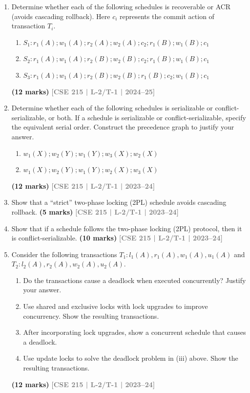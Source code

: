 \documentclass[12pt]{article}
\newcommand{\yr}[1]{\hfill\textcolor{gray}{\small\textbf{[#1]}}}
\newcommand{\mk}[1]{\textcolor{orange!70!black}{\small\textbf{(#1 marks)}}}
\begin{document}
\begin{enumerate}
\item Determine whether each of the following schedules is recoverable or ACR (avoids cascading rollback). Here $c_i$ represents the commit action of transaction $T_i$.
\begin{enumerate}
  \item $S_1\colon r_1(A); w_1(A); r_2(A); w_2(A); c_2; r_1(B); w_1(B); c_1$
  \item $S_2\colon r_1(A); w_1(A); r_2(B); w_2(B); c_2; r_1(B); w_1(B); c_1$
  \item $S_3\colon r_1(A); w_1(A); r_2(B); w_2(B); r_1(B); c_2; w_1(B); c_1$
\end{enumerate}
\mk{12} \yr{CSE 215 | L-2/T-1 | 2024--25}


\item Determine whether each of the following schedules is serializable or conflict-serializable, or both. If a schedule is serializable or conflict-serializable, specify the equivalent serial order. Construct the precedence graph to justify your answer.
\begin{enumerate}
  \item $w_1(X); w_2(Y); w_1(Y); w_3(X); w_2(X)$
  \item $w_1(X); w_2(Y); w_1(Y); w_2(X); w_3(X)$
\end{enumerate}
\mk{12} \yr{CSE 215 | L-2/T-1 | 2023--24}


\item Show that a ``strict'' two-phase locking (2PL) schedule avoids cascading rollback.
\mk{5} \yr{CSE 215 | L-2/T-1 | 2023--24}


\item Show that if a schedule follows the two-phase locking (2PL) protocol, then it is conflict-serializable.
\mk{10} \yr{CSE 215 | L-2/T-1 | 2023--24}


\item Consider the following transactions $T_1\colon l_1(A), r_1(A), w_1(A), u_1(A)$ and $T_2\colon l_2(A), r_2(A), w_2(A), u_2(A)$.
\begin{enumerate}
  \item Do the transactions cause a deadlock when executed concurrently? Justify your answer.
  \item Use shared and exclusive locks with lock upgrades to improve concurrency. Show the resulting transactions.
  \item After incorporating lock upgrades, show a concurrent schedule that causes a deadlock.
  \item Use update locks to solve the deadlock problem in (iii) above. Show the resulting transactions.
\end{enumerate}
\mk{12} \yr{CSE 215 | L-2/T-1 | 2023--24}



\end{enumerate}
\end{document}
